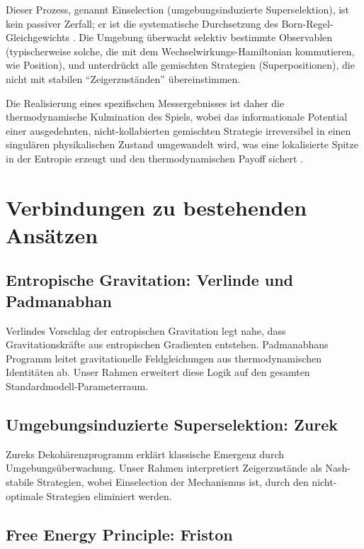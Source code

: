 \documentclass[12pt,a4paper]{article}
\theoremstyle{remark}
\begin{document}
Dieser Prozess, genannt Einselection (umgebungsinduzierte Superselektion), ist kein passiver Zerfall; er ist die systematische Durchsetzung des Born-Regel-Gleichgewichts \citep{Zurek2003}. Die Umgebung \"uberwacht selektiv bestimmte Observablen (typischerweise solche, die mit dem Wechselwirkungs-Hamiltonian kommutieren, wie Position), und unterdr\"uckt alle gemischten Strategien (Superpositionen), die nicht mit stabilen ``Zeigerzust\"anden'' \"ubereinstimmen.

Die Realisierung eines spezifischen Messergebnisses ist daher die thermodynamische Kulmination des Spiels, wobei das informationale Potential einer ausgedehnten, nicht-kollabierten gemischten Strategie irreversibel in einen singul\"aren physikalischen Zustand umgewandelt wird, was eine lokalisierte Spitze in der Entropie erzeugt und den thermodynamischen Payoff sichert \citep{Lindblad1976}.

\section{Verbindungen zu bestehenden Ans\"atzen}
\label{sec:connections}

\subsection{Entropische Gravitation: Verlinde und Padmanabhan}

Verlindes Vorschlag der entropischen Gravitation \citep{Verlinde2011} legt nahe, dass Gravitationskr\"afte aus entropischen Gradienten entstehen. Padmanabhans Programm \citep{Padmanabhan2010} leitet gravitationelle Feldgleichungen aus thermodynamischen Identit\"aten ab. Unser Rahmen erweitert diese Logik auf den gesamten Standardmodell-Parameterraum.

\subsection{Umgebungsinduzierte Superselektion: Zurek}

Zureks Dekoh\"arenzprogramm \citep{Zurek2003} erkl\"art klassische Emergenz durch Umgebungs\"uberwachung. Unser Rahmen interpretiert Zeigerzust\"ande als Nash-stabile Strategien, wobei Einselection der Mechanismus ist, durch den nicht-optimale Strategien eliminiert werden.

\subsection{Free Energy Principle: Friston}
\end{document}
